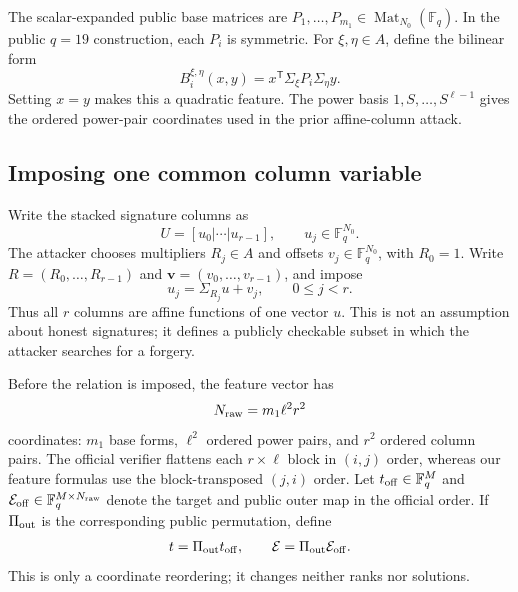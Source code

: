 \documentclass[11pt]{article}
\newcommand{\F}{\mathbb F}
\newcommand{\Mat}{\operatorname{Mat}}
\newcommand{\transpose}{\mathsf T}
\begin{document}
The scalar-expanded public base matrices are
$P_1,\ldots,P_{m_1}\in\Mat_{N_0}(\F_q)$.  In the public $q=19$ construction,
each $P_i$ is symmetric.  For $\xi,\eta\in A$, define the bilinear form
\begin{equation}\label{eq:bilinear-form}
 B_i^{\xi,\eta}(x,y)=x^\transpose\Sigma_\xi P_i\Sigma_\eta y.
\end{equation}
Setting $x=y$ makes this a quadratic feature.  The power basis
$1,S,\ldots,S^{\ell-1}$ gives the ordered power-pair coordinates used in the
prior affine-column attack.

\subsection{Imposing one common column variable}\label{sec:affine-columns}

Write the stacked signature columns as
\[
  U=[u_0|\cdots|u_{r-1}],\qquad u_j\in\F_q^{N_0}.
\]
The attacker chooses multipliers $R_j\in A$ and offsets
$v_j\in\F_q^{N_0}$, with $R_0=1$.  Write
$R=(R_0,\ldots,R_{r-1})$ and
$\mathbf v=(v_0,\ldots,v_{r-1})$, and impose
\begin{equation}\label{eq:relation}
 u_j=\Sigma_{R_j}u+v_j,
 \qquad 0\le j<r.
\end{equation}
Thus all $r$ columns are affine functions of one vector $u$.  This is not an
assumption about honest signatures; it defines a publicly checkable subset in
which the attacker searches for a forgery.

Before the relation is imposed, the feature vector has
\[
  N_{\rm raw}=m_1\ell^2r^2
\]
coordinates: $m_1$ base forms, $\ell^2$ ordered power pairs, and $r^2$ ordered
column pairs.  The official verifier flattens each $r\times\ell$ block in
$(i,j)$ order, whereas our feature formulas use the block-transposed $(j,i)$
order.  Let $t_{\rm off}\in\F_q^M$ and
$\mathcal E_{\rm off}\in\F_q^{M\times N_{\rm raw}}$ denote the target and public outer
map in the official order.  If $\Pi_{\rm out}$ is the corresponding public
permutation, define
\[
  t=\Pi_{\rm out}t_{\rm off},\qquad
  \mathcal E=\Pi_{\rm out}\mathcal E_{\rm off}.
\]
This is only a coordinate reordering; it changes neither ranks nor solutions.
\end{document}
